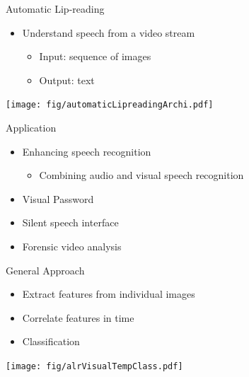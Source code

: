 \documentclass[xcolor=table]{beamer}
\begin{document}
\begin{frame}{Automatic Lip-reading}
    \begin{itemize}
        \item Understand speech from a video stream
        \begin{itemize}
            \item Input: sequence of images
            \item Output: text 
        \end{itemize}
    \end{itemize}
    \begin{center}
    \texttt{[image: fig/automaticLipreadingArchi.pdf]}   
    \end{center}
\end{frame}

\begin{frame}{Application}
    \begin{itemize}
        \item Enhancing speech recognition
        \begin{itemize}
            \item Combining audio and visual speech recognition 
        \end{itemize}
        \item Visual Password 
        \item Silent speech interface
        \item Forensic video analysis 
    \end{itemize}
\end{frame}

\begin{frame}{General Approach}
    \begin{itemize}
        \item Extract features from individual images
        \item Correlate features in time
        \item Classification 
    \end{itemize}
    \begin{center}
    \texttt{[image: fig/alrVisualTempClass.pdf]}   
    \end{center}
\end{frame}
\end{document}
